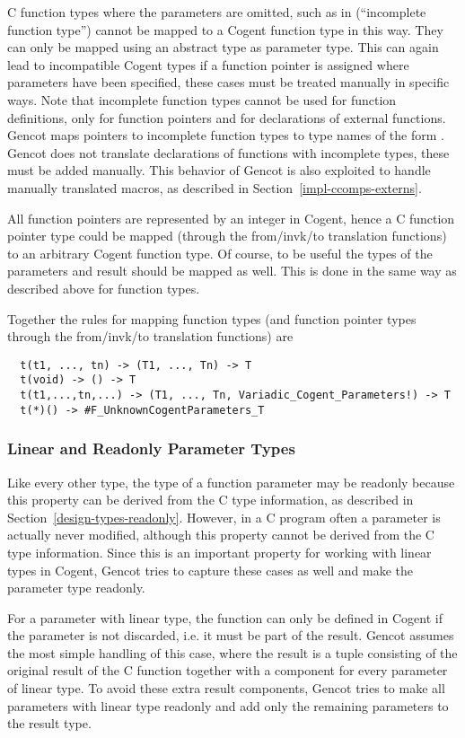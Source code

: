 C function types where the parameters are omitted, such as in  (``incomplete function type'') 
cannot be mapped to a Cogent function type in this way. 
They can only be mapped using an abstract type as parameter type. This can again lead to incompatible 
Cogent types if a function pointer is assigned where parameters have been specified, these cases must 
be treated manually in specific ways. Note that incomplete function types cannot be used for function
definitions, only for function pointers and for declarations of external functions. Gencot maps pointers 
to incomplete function types to type names of the form . 
Gencot does not translate declarations of functions with incomplete types, these must be added manually.
This behavior of Gencot is also exploited to handle manually translated macros, as described in 
Section~\ref{impl-ccomps-externs}.

All function pointers are represented by an integer in Cogent, hence a C function pointer type could be 
mapped (through the from/invk/to translation functions) to an arbitrary Cogent function type.
Of course, to be useful the types of the parameters and result should be mapped as well. This is done
in the same way as described above for function types.

Together the rules for mapping function types (and function pointer types through the from/invk/to translation 
functions) are
\begin{verbatim}
  t(t1, ..., tn) -> (T1, ..., Tn) -> T
  t(void) -> () -> T
  t(t1,...,tn,...) -> (T1, ..., Tn, Variadic_Cogent_Parameters!) -> T
  t(*)() -> #F_UnknownCogentParameters_T
\end{verbatim}

\subsubsection{Linear and Readonly Parameter Types}

Like every other type, the type of a function parameter may be readonly because this property can be derived
from the C type information, as described in Section~\ref{design-types-readonly}. However, in a C program 
often a parameter is actually never modified, although this property cannot be derived from the C type information.
Since this is an important property for working with linear types in Cogent, Gencot tries to capture these
cases as well and make the parameter type readonly.

For a parameter with linear type, the function can only be defined in Cogent if the parameter is not discarded,
i.e. it must be part of the result. Gencot assumes the most simple handling of this case, where the result
is a tuple consisting of the original result of the C function together with a component for every parameter
of linear type. To avoid these extra result components, Gencot tries to make all parameters with linear type
readonly and add only the remaining parameters to the result type.

